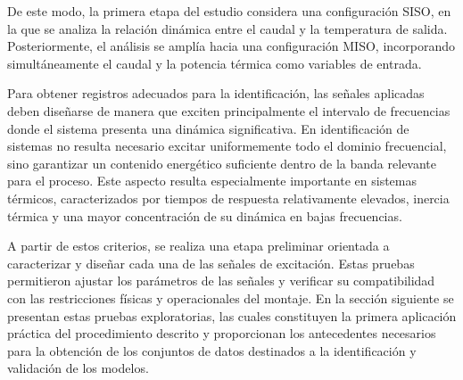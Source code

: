 \documentclass[11pt]{report}
\begin{document}
De este modo, la primera etapa del estudio considera una configuración SISO, en la que se analiza la relación dinámica entre el caudal y la temperatura de salida. Posteriormente, el análisis se amplía hacia una configuración MISO, incorporando simultáneamente el caudal y la potencia térmica como variables de entrada. 

Para obtener registros adecuados para la identificación, las señales aplicadas deben diseñarse de manera que exciten principalmente el intervalo de frecuencias donde el sistema presenta una dinámica significativa. En identificación de sistemas no resulta necesario excitar uniformemente todo el dominio frecuencial, sino garantizar un contenido energético suficiente dentro de la banda relevante para el proceso. Este aspecto resulta especialmente importante en sistemas térmicos, caracterizados por tiempos de respuesta relativamente elevados, inercia térmica y una mayor concentración de su dinámica en bajas frecuencias.

A partir de estos criterios, se realiza una etapa preliminar orientada a caracterizar y diseñar cada una de las señales de excitación. Estas pruebas permitieron ajustar los parámetros de las señales y verificar su compatibilidad con las restricciones físicas y operacionales del montaje. En la sección siguiente se presentan estas pruebas exploratorias, las cuales constituyen la primera aplicación práctica del procedimiento descrito y proporcionan los antecedentes necesarios para la obtención de los conjuntos de datos destinados a la identificación y validación de los modelos.




\end{document}

